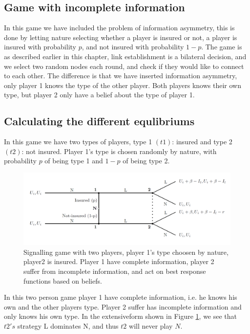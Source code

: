 \subsection{Game with incomplete information}
In this game we have included the problem of information asymmetry, this is done by letting nature selecting whether a player is insured or not, a player is insured with probability $p$, and not insured with probability $1-p$. 
The game is as described earlier in this chapter, link establishment is a bilateral decision, and we select two random nodes each round, and check if they would like to connect to each other. The difference is that we have inserted information asymmetry, only player 1 knows the type of the other player. Both players knows their own type, but player 2 only have a belief about the type of player 1.
\subsection{Calculating the different equlibriums}
In this game we have two types of players, type 1 $(t1)$: insured and type 2 $(t2)$: not insured. 
Player 1's type is chosen randomly by nature, with probability $p$ of being type 1 and $1-p$ of being type 2.
\begin{figure}[h]
\centering
  \centering
\includegraphics[width=1\linewidth]{../Figures/SignalingGameInsured.png}

\caption{Signalling game with two players, player 1's type choosen by nature, player2 is insured. Player 1 have complete information, player 2 suffer from incomplete information, and act on best response functions based on beliefs. \label{fig:signalingInsured}}

\end{figure}
In this two person game player 1 have complete information, i.e. he knows his own and the other players type. Player 2 suffer has incomplete information and only knows his own type. 
In the extensiveform shown in Figure \ref{fig:signalingInsured}, we see that $t2's$ strategy L dominates N, and thus $t2$ will never play $N$.
